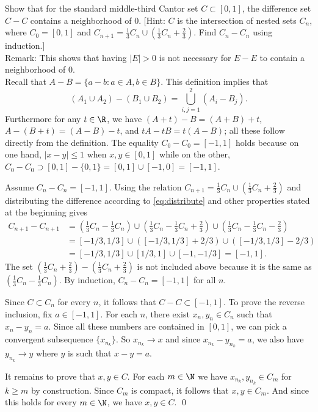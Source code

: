 \begin{hwsol}
Show that for the standard middle-third Cantor set $C \subset [0, 1]$, the difference set $C-C$ contains a neighborhood of $0$. [Hint: $C$ is the intersection of nested sets $C_n$, where $C_0=[0, 1]$  and $C_{n+1}=\frac{1}{3} C_n \cup ( \frac{1}{3} C_n + \frac{2}{3})$. Find $C_n - C_n$ using induction.] \\

\noindent Remark: This shows that having $|E|>0$ is not necessary for $E - E$ to contain a neighborhood of $0$. \\

\pf Recall that $A - B= \{ a - b \colon a \in A, b \in B \}$. This definition implies that 
	\begin{equation} \label{eq:distribute}
	(A_1 \cup A_2) - (B_1 \cup B_2)= \bigcup_{i, j=1}^2 (A_i - B_j).
	\end{equation}
Furthermore for any  $t \in \R$, we have $( A + t ) - B= ( A + B ) + t$, $A -( B + t )= ( A - B ) - t$, and $tA - tB = t(A-B)$; all these follow directly from the definition. The equality $C_0 - C_0= [-1, 1]$ holds because  on one hand, $|x-y| \leq 1$ when $x, y \in [0,1]$ while on the other, $C_0 - C_0 \supset [0, 1] - \{ 0,1 \}= [0,1] \cup [-1,0]= [-1,1]$.  

Assume $C_n - C_n = [-1,1]$. Using the relation $C_{n+1}= \frac{1}{3} C_n \cup ( \frac{1}{3} C_n + \frac{2}{3})$ and distributing the difference according to \eqref{eq:distribute} and other properties stated at the beginning gives
        \[
        \begin{split}
        C_{n+1}- C_{n+1} &= \left( \frac{1}{3} C_n - \frac{1}{3} C_n \right) \cup \left( \frac{1}{3} C_n - \frac{1}{3} C_n + \frac{2}{3} \right) \cup \left( \frac{1}{3} C_n - \frac{1}{3} C_n - \frac{2}{3} \right) \\ 
        & = [-1/3,1/3] \cup ( [-1/3, 1/3] + 2/3) \cup ( [-1/3,1/3] - 2/3 ) \\ 
        & = [-1/3,1/3] \cup [1/3,1] \cup  [-1,-1/3] = [-1,1].
        \end{split}
        \]
The set $ \left( \frac{1}{3} C_n + \frac{2}{3} \right) - \left( \frac{1}{3} C_n + \frac{2}{3} \right)$ is not included above because it is the same as $\left( \frac{1}{3} C_n - \frac{1}{3} C_n \right)$. By induction, $C_n - C_n= [-1,1]$ for all $n$. 

Since $C \subset C_n$ for every $n$, it follows that $C - C \subset [-1,1]$. To prove the reverse inclusion, fix $a \in [-1,1]$. For each $n$, there exist $x_n,y_n \in C_n$ such that $x_n - y_n=a$. Since all these numbers are contained in $[0,1]$, we can pick a convergent subsequence  $\{x_{n_k}\}$. So $x_{n_k} \to x$ and since $x_{n_k} - y_{n_k}=a$, we also have $y_{n_k} \to y$ where $y$ is such that $x - y=a$.  

It remains to prove that $x, y \in C$. For each $m \in \N$ we have $x_{n_k}, y_{n_k} \in C_m$ for $k \geq m$ by construction. Since $C_m$ is compact, it follows that $x,y \in C_m$.  And since this holds for every $m \in \N$, we have $x,y \in C$. \qed \\
\end{hwsol}


